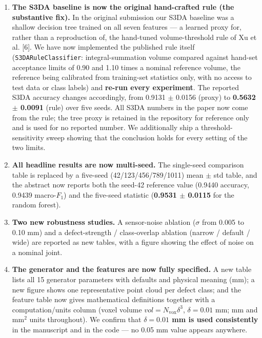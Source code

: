 \documentclass[11pt]{article}
\begin{document}
\begin{enumerate}[leftmargin=*,itemsep=3pt]
\item \textbf{The S3DA baseline is now the original hand-crafted rule (the substantive fix).}
In the original submission our S3DA baseline was a shallow decision tree trained on all
seven features --- a learned proxy for, rather than a reproduction of, the hand-tuned
volume-threshold rule of Xu et al. [6]. We have now implemented the published rule itself
(\texttt{S3DARuleClassifier}: integral-summation volume compared against hand-set
acceptance limits of 0.90 and 1.10 times a nominal reference volume, the reference being
calibrated from training-set statistics only, with no access to test data or class labels)
and \textbf{re-run every experiment}. The reported S3DA accuracy changes accordingly, from
0.9131 $\pm$ 0.0156 (proxy) to \textbf{0.5632 $\pm$ 0.0091} (rule) over five seeds. All S3DA
numbers in the paper now come from the rule; the tree proxy is retained in the repository
for reference only and is used for no reported number. We additionally ship a
threshold-sensitivity sweep showing that the conclusion holds for every setting of the two
limits.

\item \textbf{All headline results are now multi-seed.} The single-seed comparison table is
replaced by a five-seed (42/123/456/789/1011) mean $\pm$ std table, and the abstract now
reports both the seed-42 reference value (0.9440 accuracy, 0.9439 macro-$F_1$) and the
five-seed statistic (\textbf{0.9531 $\pm$ 0.0115} for the random forest).

\item \textbf{Two new robustness studies.} A sensor-noise ablation ($\sigma$ from 0.005 to
0.10 mm) and a defect-strength / class-overlap ablation (narrow / default / wide) are
reported as new tables, with a figure showing the effect of noise on a nominal joint.

\item \textbf{The generator and the features are now fully specified.} A new table lists all
15 generator parameters with defaults and physical meaning (mm); a new figure shows one
representative point cloud per defect class; and the feature table now gives mathematical
definitions together with a computation/units column (voxel volume
$\mathit{vol} = N_{\mathrm{vox}}\delta^{3}$, $\delta = 0.01$ mm; mm and mm$^2$ units
throughout). We confirm that \textbf{$\delta = 0.01$ mm is used consistently} in the
manuscript and in the code --- no 0.05 mm value appears anywhere.


\end{enumerate}
\end{document}

